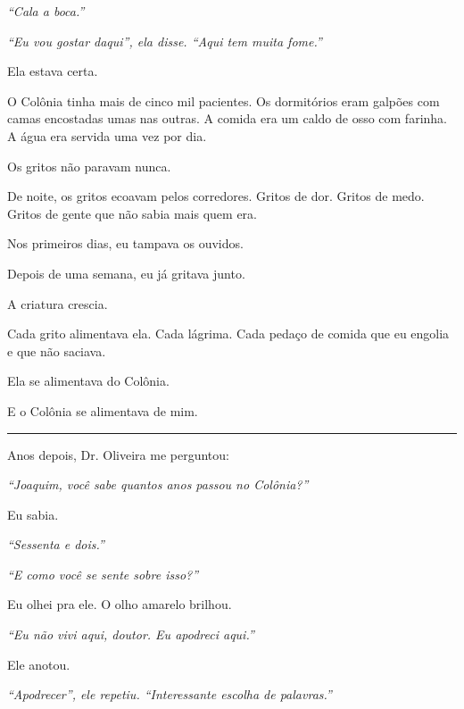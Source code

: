 \noindent \textit{\textquotedblleft{}Cala a boca.\textquotedblright{}}

\noindent \textit{\textquotedblleft{}Eu vou gostar daqui\textquotedblright{}\textit{, ela disse. }\textquotedblleft{}Aqui tem muita fome.\textquotedblright{}}

\noindent Ela estava certa.

\noindent O Colônia tinha mais de cinco mil pacientes. Os dormitórios eram galpões com camas encostadas umas nas outras. A comida era um caldo de osso com farinha. A água era servida uma vez por dia.

\noindent Os gritos não paravam nunca.

\noindent De noite, os gritos ecoavam pelos corredores. Gritos de dor. Gritos de medo. Gritos de gente que não sabia mais quem era.

\noindent Nos primeiros dias, eu tampava os ouvidos.

\noindent Depois de uma semana, eu já gritava junto.

\noindent A criatura crescia.

\noindent Cada grito alimentava ela. Cada lágrima. Cada pedaço de comida que eu engolia e que não saciava.

\noindent Ela se alimentava do Colônia.

\noindent E o Colônia se alimentava de mim.

\vspace{0.5em}\noindent\rule{\textwidth}{0.5pt}\vspace{0.5em}

\noindent Anos depois, Dr. Oliveira me perguntou:

\noindent \textit{\textquotedblleft{}Joaquim, você sabe quantos anos passou no Colônia?\textquotedblright{}}

\noindent Eu sabia.

\noindent \textit{\textquotedblleft{}Sessenta e dois.\textquotedblright{}}

\noindent \textit{\textquotedblleft{}E como você se sente sobre isso?\textquotedblright{}}

\noindent Eu olhei pra ele. O olho amarelo brilhou.

\noindent \textit{\textquotedblleft{}Eu não vivi aqui, doutor. Eu apodreci aqui.\textquotedblright{}}

\noindent Ele anotou.

\noindent \textit{\textquotedblleft{}Apodrecer\textquotedblright{}\textit{, ele repetiu. }\textquotedblleft{}Interessante escolha de palavras.\textquotedblright{}}

